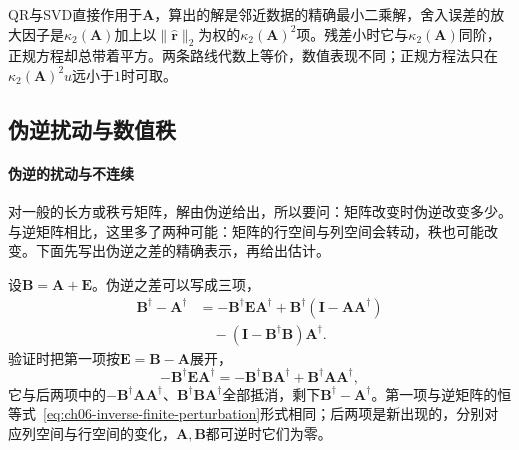 QR与SVD直接作用于$\bm A$，算出的解是邻近数据的精确最小二乘解，舍入误差的放大因子是$\kappa_2(\bm A)$加上以$\lVert\hat{\bm r}\rVert_2$为权的$\kappa_2(\bm A)^2$项。残差小时它与$\kappa_2(\bm A)$同阶，正规方程却总带着平方。两条路线代数上等价，数值表现不同；正规方程法只在$\kappa_2(\bm A)^2u$远小于$1$时可取。

\subsection{伪逆扰动与数值秩}
\label{sec:ls-pseudoinverse-rank-change}

\paragraph{伪逆的扰动与不连续}
对一般的长方或秩亏矩阵，解由伪逆给出，所以要问：矩阵改变时伪逆改变多少。与逆矩阵相比，这里多了两种可能：矩阵的行空间与列空间会转动，秩也可能改变。下面先写出伪逆之差的精确表示，再给出估计。

设$\bm B=\bm A+\bm E$。伪逆之差可以写成三项，
\begin{equation}
 \begin{aligned}
 \bm B^\dagger-\bm A^\dagger
 &=-\bm B^\dagger\bm E\bm A^\dagger+\bm B^\dagger(\bm I-\bm A\bm A^\dagger)\\
 &\quad-(\bm I-\bm B^\dagger\bm B)\bm A^\dagger .
 \end{aligned}
 \label{eq:ls-pseudoinverse-difference-identity}
\end{equation}
验证时把第一项按$\bm E=\bm B-\bm A$展开，
\[
 -\bm B^\dagger\bm E\bm A^\dagger=-\bm B^\dagger\bm B\bm A^\dagger+\bm B^\dagger\bm A\bm A^\dagger ,
\]
它与后两项中的$-\bm B^\dagger\bm A\bm A^\dagger$、$\bm B^\dagger\bm B\bm A^\dagger$全部抵消，剩下$\bm B^\dagger-\bm A^\dagger$。第一项与逆矩阵的恒等式~\eqref{eq:ch06-inverse-finite-perturbation}形式相同；后两项是新出现的，分别对应列空间与行空间的变化，$\bm A,\bm B$都可逆时它们为零。

